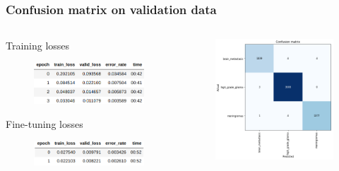 \documentclass{beamer}
\begin{document}
\begin{frame}
\frametitle{Confusion matrix on validation data}
\begin{columns}
	\begin{column}{0.45\textwidth}
		Training losses
		\begin{figure}
			\centering
			\includegraphics[width=1.0\textwidth]{images/classification_loss_1.png}
		\end{figure}
		Fine-tuning losses
		\begin{figure}
			\centering
			\includegraphics[width=1.0\textwidth]{images/classification_loss_2.png}
		\end{figure}
	\end{column}
	\begin{column}{0.55\textwidth}
		\begin{figure}
			\centering
			\includegraphics[width=1.0\textwidth]{images/classification_confusion_matrix.png}

\end{figure}
\end{column}
\end{columns}
\end{frame}
\end{document}
